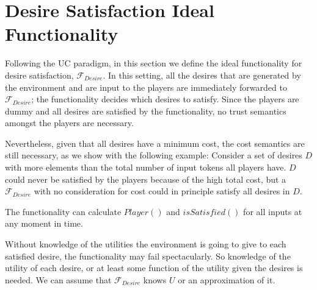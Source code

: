 \section{Desire Satisfaction Ideal Functionality}
  Following the UC paradigm, in this section we define the ideal functionality for desire satisfaction, $\mathcal{F}_{Desire}$.
  In this setting, all the desires that are generated by the environment and are input to the players are immediately forwarded
  to $\mathcal{F}_{Desire}$; the functionality decides which desires to satisfy. Since the players are dummy and all desires
  are satisfied by the functionality, no trust semantics amongst the players are necessary.
  
  Nevertheless, given that all desires have a minimum cost, the cost semantics are still necessary, as we show with the
  following example: Consider a set of desires $D$ with more elements than the total number of input tokens all players have.
  $D$ could never be satisfied by the players because of the high total cost, but a $\mathcal{F}_{Desire}$ with no
  consideration for cost could in principle satisfy all desires in $D$.

  The functionality can calculate $Player\left(\right)$ and $isSatisfied\left(\right)$ for all inputs at any moment in time.

  Without knowledge of the utilities the environment is going to give to each satisfied desire, the functionality may fail
  spectacularly. So knowledge of the utility of each desire, or at least some function of the utility given the desires is
  needed. We can assume that $\mathcal{F}_{Desire}$ knows $U$ or an approximation of it.
